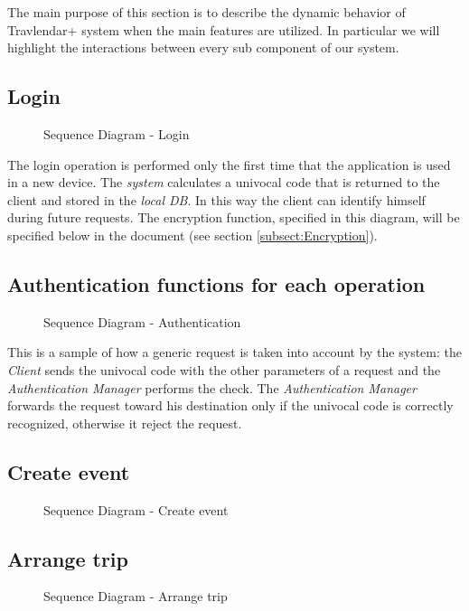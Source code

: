 The main purpose of this section is to describe the dynamic behavior of Travlendar+ system when the main features are utilized. In particular we will highlight the interactions between every sub component of our system.
\subsection{Login}
			\begin{figure}[H]
				\noindent{}
				\caption{Sequence Diagram - Login}
			\end{figure}
			The login operation is performed only the first time that the application is used in a new device. 
			The \textit{system} calculates a univocal code that is returned to the client and stored in the \textit{local DB}. In this way the client can identify himself during future requests. 
			The encryption function, specified in this diagram, will be specified below in the document (see section \ref{subsect:Encryption}).
\subsection{Authentication functions for each operation}
	\begin{figure}[H]
		\noindent{}
	\caption{Sequence Diagram - Authentication}
	\end{figure}
		This is a sample of how a generic request is taken into account by the system: the \textit{Client} sends the univocal code with the other parameters of a request and the \textit{Authentication Manager} performs the check. 
		The \textit{Authentication Manager} forwards the request toward his destination only if the univocal code is correctly recognized, otherwise it reject the request.
\subsection{Create event}
	\begin{figure}[H]
		\noindent{}
		\caption{Sequence Diagram - Create event}
	\end{figure}
\subsection{Arrange trip}
	\begin{figure}[H]
		\noindent{}
		\caption{Sequence Diagram - Arrange trip}
	\end{figure}
